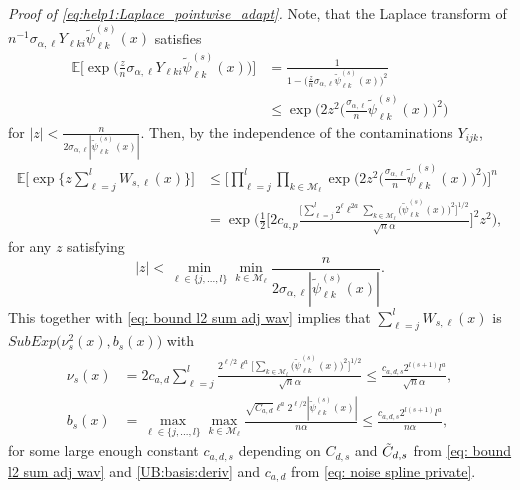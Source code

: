 \documentclass[preprint]{imsart}
\newcommand{\E}{{\mathbb E}}
\numberwithin{equation}{section}
\begin{document}
\begin{appendix}
\textit{Proof of \eqref{eq:help1:Laplace_pointwise_adapt}.} Note, that the Laplace transform of $n^{-1}\sigma_{\alpha,\ell} Y_{\ell k i} \tilde\psi_{\ell k}^{(s)}(x)$ satisfies
\begin{align*}
\E \Big[ \exp\Big(  \frac{z}{n}  \sigma_{\alpha,\ell}Y_{\ell k i} \tilde\psi_{\ell k}^{(s)}(x)\Big) \Big]
&=\frac{1}{1-\big( \frac{z}{n}\sigma_{\alpha,\ell}   \tilde\psi_{\ell k}^{(s)}(x)\big)^2}\\
&\leq \exp\Big(  2z^2 \big(\frac{\sigma_{\alpha,\ell}}{n}  \tilde\psi_{\ell k}^{(s)}(x)\big)^2 \Big)
\end{align*}
for $|z|<\frac{n}{2\sigma_{\alpha,\ell} |\tilde\psi_{\ell k}^{(s)}(x)|}$. Then, by the independence of the contaminations $Y_{ijk}$, 
\begin{align*}
\E\Big[ \exp\Big\{z  \sum_{\ell=j}^{l}  W_{s,\ell}(x)  \Big\}\Big]
&\leq \Big[ \prod_{\ell=j}^{l}  \prod_{k\in\mathcal{M}_\ell}\exp\Big(2z^2 \big(\frac{\sigma_{\alpha,\ell}}{n}  \tilde\psi_{\ell k}^{(s)}(x)\big)^2 \Big)  \Big]^n\\
&= \exp\Big( \frac{1}{2}\Big[2 c_{a,p} \frac{ \big[ \sum_{\ell=j}^{l} 2^{\ell} \ell^{2a}  \sum_{k\in\mathcal{M}_\ell}\big( \tilde\psi_{\ell k}^{(s)}(x)\big)^2\big]^{1/2}}{\sqrt{n}\alpha}\Big]^2 z^2 \Big),
\end{align*}
for any $z$ satisfying
$$|z|<\min_{\ell\in\{j,...,l\}}\min_{k\in\mathcal{M}_\ell}\frac{n}{2\sigma_{\alpha,\ell} |\tilde\psi_{\ell k}^{(s)}(x)|}.$$
This together with \eqref{eq: bound l2 sum adj wav} implies that $ \sum_{\ell=j}^{l}W_{s,\ell}(x)$ is $SubExp\big( \nu_{s}^2(x),b_{s}(x)\big)$ with
\begin{align}
\nu_{s}(x)&=2 c_{a,d} \sum_{\ell=j}^{l} \frac{ 2^{\ell/2} \ell^a \big[\sum_{k\in\mathcal{M}_\ell}\big( \tilde\psi_{\ell k}^{(s)}(x)\big)^2\big]^{1/2}}{\sqrt{n}\alpha}
\leq  \frac{ c_{a,d,s}2^{l(s+1)} l^a}{\sqrt{n}\alpha},\nonumber\\
b_{s}(x)&=\max_{\ell\in\{j,...,l\}}\max_{k\in\mathcal{M}_\ell}\frac{\sqrt{C_{a,d}} \ell^a 2^{\ell/2}|\tilde\psi_{\ell k}^{(s)}(x)|}{n\alpha}\leq \frac{ c_{a,d,s} 2^{l(s+1)}l^a}{n\alpha},\label{def:nu:b}
\end{align}
for some large enough constant $c_{a,d,s}$ depending on $C_{d,s}$ and $\Tilde{C}_{d,s}$ from \eqref{eq: bound l2 sum adj wav} and \eqref{UB:basis:deriv} and $c_{a,d}$ from \eqref{eq: noise spline private}.


\end{appendix}
\end{document}
